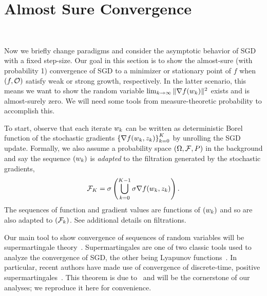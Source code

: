 \section{Almost Sure Convergence}~\label{sec:almost-sure}

Now we briefly change paradigms and consider the asymptotic behavior of \ac{SGD} with a fixed step-size.
Our goal in this section is to show the almost-sure (with probability 1) convergence of \ac{SGD} to a minimizer or stationary point of \( f \) when \( \rbr{f, \oracle{}} \) satisfy weak or strong growth, respectively.
In the latter scenario, this means we want to show the random variable \( \lim_{\iter \rightarrow \infty} \norm{\grad(\wk)}^2 \) exists and is almost-surely zero.
We will need some tools from measure-theoretic probability to accomplish this.

To start, observe that each iterate \( \w_k \) can be written as deterministic Borel function of the stochastic gradients \( \cbr{\grad(\wk, \zk)}_{\iter=0}^{K} \) by unrolling the \ac{SGD} update.
Formally, we also assume a probability space \( \rbr{\Omega,  \calF, P} \) in the background and say the sequence \( \seq{\wk} \) is \emph{adapted} to the filtration generated by the stochastic gradients,
\begin{align*}
    \calF_K = \sigma \rbr{\bigcup_{\iter = 0}^{K-1} \sigma \grad(\wk, \zk)}.
\end{align*}
The sequences of function and gradient values are functions of \( \seq{\wk} \) and so are also adapted to \( \seq{\calF_\iter} \).
See \citet{ccinlar2011probability} additional details on filtrations.

Our main tool to show convergence of sequences of random variables will be supermartingale theory~\citep{ccinlar2011probability}.
Supermartingales are one of two classic tools used to analyze the convergence of \ac{SGD}, the other being Lyapunov functions~\citep{bertsekas2000gradient}.
In particular, recent authors have made use of convergence of discrete-time, positive supermartingales~\citep{bertsekas2011incremental, nguyen2018sgd}.
This theorem is due to~\citet{neveu1975discrete} and will be the cornerstone of our analyses; we reproduce it here for convenience.

